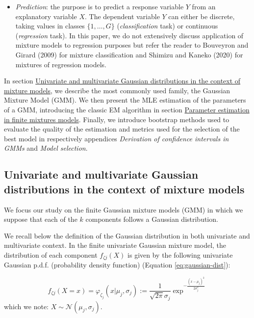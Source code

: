 \begin{itemize}
\tightlist
\item
  \emph{Prediction}: the purpose is to predict a response variable \(Y\) from
  an explanatory variable \(X\). The dependent variable \(Y\) can either
  be discrete, taking values in classes \(\{1, \ldots, G\}\)
  (\emph{classification} task) or continuous (\emph{regression} task). In this
  paper, we do not extensively discuss application of mixture models to regression purposes but refer the reader
  to Bouveyron and Girard (2009) for mixture classification and
  Shimizu and Kaneko (2020) for mixtures of regression models.
\end{itemize}

In section \protect\hyperlink{univariate-and-multivariate-gaussian-distributions-in-the-context-of-mixture-models}{Univariate and multivariate Gaussian distributions in the context of mixture models}, we describe the most
commonly used family, the Gaussian Mixture Model (GMM). We then present
the MLE estimation of the parameters of a GMM, introducing the classic
EM algorithm in section \protect\hyperlink{parameter-estimation-in-finite-mixtures-models}{Parameter estimation in finite mixtures models}. Finally, we introduce bootstrap methods used to evaluate the
quality of the estimation and metrics used for the selection of the best
model in respectively appendices \emph{Derivation of confidence intervals in GMMs} and \emph{Model selection}.

\hypertarget{univariate-and-multivariate-gaussian-distributions-in-the-context-of-mixture-models}{%
\subsection{Univariate and multivariate Gaussian distributions in the context of mixture models}\label{univariate-and-multivariate-gaussian-distributions-in-the-context-of-mixture-models}}

We focus our study on the finite Gaussian mixture models (GMM) in which we
suppose that each of the \(k\) components follows a Gaussian
distribution.

We recall below the definition of the Gaussian
distribution in both univariate and multivariate context. In the finite univariate Gaussian mixture model, the distribution of
each component \(f_{\zeta j}(X)\) is given by the following univariate
Gaussian p.d.f. (probability density function) (Equation
\eqref{eq:gaussian-dist}):

\begin{equation}
f_{\zeta j}(X=x)=\varphi_{\zeta_j}(x | \mu_j, \sigma_j):=\frac{1}{\sqrt{2\pi} \sigma_j} \exp^{- \frac{(x - \mu_j)^2}{2 \sigma_j^2}}
\label{eq:gaussian-dist}
\end{equation} which we note: \(X \sim \mathcal{N}(\mu_j, \sigma_j)\).

